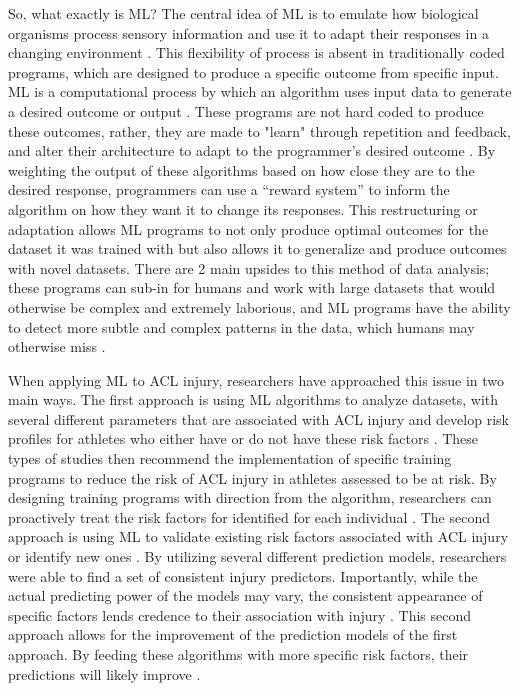 \documentclass[stu,12pt,floatsintext]{apa7}
\begin{document}
So, what exactly is ML? The central idea of ML is to emulate how biological organisms process sensory information and use it to adapt their responses in a changing environment \parencite{MLhistory, WhatisML}. This flexibility of process is absent in traditionally coded programs, which are designed to produce a specific outcome from specific input.   ML is a computational process by which an algorithm uses input data to generate a desired outcome or output \parencite{WhatisML}. These programs are not hard coded to produce these outcomes, rather, they are made to "learn" through repetition and feedback, and alter their architecture to adapt to the programmer's desired outcome \parencite{WhatisML}. By weighting the output of these algorithms based on how close they are to the desired response, programmers can use a “reward system” to inform the algorithm on how they want it to change its responses. This restructuring or adaptation allows ML programs to not only produce optimal outcomes for the dataset it was trained with but also allows it to generalize and produce outcomes with novel datasets.  There are 2 main upsides to this method of data analysis; these programs can sub-in for humans and work with large datasets that would otherwise be complex and extremely laborious, and ML programs have the ability to detect more subtle and complex patterns in the data, which humans may otherwise miss \parencite{WhatisML}. 

When applying ML to ACL injury, researchers have approached this issue in two main ways. The first approach is using ML algorithms to analyze datasets, with several different parameters that are associated with ACL injury and develop risk profiles for athletes who either have or do not have these risk factors \parencite{Jauhiainen_2022,Taborri_2021}. These types of studies then recommend the implementation of specific training programs to reduce the risk of ACL injury in athletes assessed to be at risk. By designing training programs with direction from the algorithm, researchers can proactively treat the risk factors for identified for each individual \parencite{Taborri_2021}. The second approach is using ML to validate existing risk factors associated with ACL injury or identify new ones \parencite{Jauhiainen_2020, Kokkotis_2022}. By utilizing several different prediction models, researchers were able to find a set of consistent injury predictors. Importantly, while the actual predicting power of the models may vary, the consistent appearance of specific factors lends credence to their association with injury \parencite{Jauhiainen_2020,Kokkotis_2022}. This second approach allows for the improvement of the prediction models of the first approach. By feeding these algorithms with more specific risk factors, their predictions will likely improve \parencite{Jauhiainen_2020}.
\end{document}
